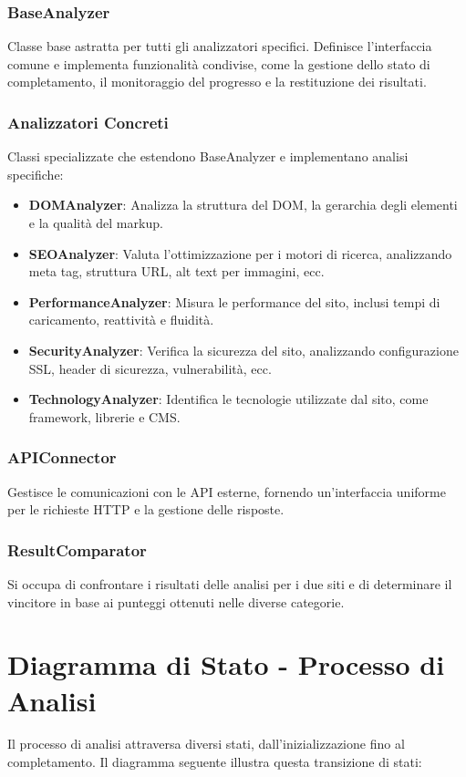 \subsubsection{BaseAnalyzer}
Classe base astratta per tutti gli analizzatori specifici. Definisce l'interfaccia comune e implementa funzionalità condivise, come la gestione dello stato di completamento, il monitoraggio del progresso e la restituzione dei risultati.

\subsubsection{Analizzatori Concreti}
Classi specializzate che estendono BaseAnalyzer e implementano analisi specifiche:
\begin{itemize}
    \item \textbf{DOMAnalyzer}: Analizza la struttura del DOM, la gerarchia degli elementi e la qualità del markup.
    \item \textbf{SEOAnalyzer}: Valuta l'ottimizzazione per i motori di ricerca, analizzando meta tag, struttura URL, alt text per immagini, ecc.
    \item \textbf{PerformanceAnalyzer}: Misura le performance del sito, inclusi tempi di caricamento, reattività e fluidità.
    \item \textbf{SecurityAnalyzer}: Verifica la sicurezza del sito, analizzando configurazione SSL, header di sicurezza, vulnerabilità, ecc.
    \item \textbf{TechnologyAnalyzer}: Identifica le tecnologie utilizzate dal sito, come framework, librerie e CMS.
\end{itemize}

\subsubsection{APIConnector}
Gestisce le comunicazioni con le API esterne, fornendo un'interfaccia uniforme per le richieste HTTP e la gestione delle risposte.

\subsubsection{ResultComparator}
Si occupa di confrontare i risultati delle analisi per i due siti e di determinare il vincitore in base ai punteggi ottenuti nelle diverse categorie.

\section{Diagramma di Stato - Processo di Analisi}
Il processo di analisi attraversa diversi stati, dall'inizializzazione fino al completamento. Il diagramma seguente illustra questa transizione di stati:

